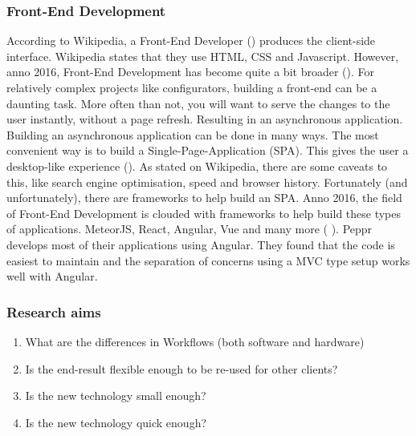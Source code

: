 \subsubsection{Front-End Development}
According to Wikipedia, a Front-End Developer (\cite{frontEndDevDefinition}) produces the client-side interface. Wikipedia states that they use HTML, CSS and Javascript. However, anno 2016, Front-End Development has become quite a bit broader (\cite{javascriptAnno2016}). For relatively complex projects like configurators, building a front-end can be a daunting task. More often than not, you will want to serve the changes to the user instantly, without a page refresh. Resulting in an asynchronous application.
Building an asynchronous application can be done in many ways. The most convenient way is to build a Single-Page-Application (SPA). This gives the user a desktop-like experience (\cite{singlePageApplications}). As stated on Wikipedia, there are some caveats to this, like search engine optimisation, speed and browser history. Fortunately (and unfortunately), there are frameworks to help build an SPA. Anno 2016, the field of Front-End Development is clouded with frameworks to help build these types of applications. MeteorJS, React, Angular, Vue and many more (\cite{frontEndJavascriptFrameworks} ).
Peppr develops most of their applications using Angular. They found that the code is easiest to maintain and the separation of concerns using a MVC type setup works well with Angular.

\subsubsection{Research aims}
\begin{enumerate}
	\item {What are the differences in Workflows (both software and hardware)}
	\item {Is the end-result flexible enough to be re-used for other clients?}
	\item {Is the new technology small enough?}
	\item {Is the new technology quick enough?}
\end{enumerate}


